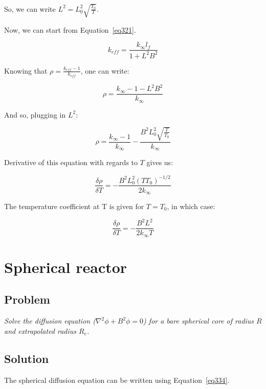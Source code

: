 So, we can write $L^2 = L_0^2\sqrt{\frac{T_0}{T}}$.

Now, we can start from Equation~\ref{eq321}.


\begin{equation}\label{eq321}
k_{eff} = \frac{k_{\infty} l_f}{1 + L^2B^2}
\end{equation}

Knowing that $\rho = \frac{k_{eff} - 1}{k_{eff}}$, one can write:


\begin{equation}\label{eq322}
\rho = \frac{k_{\infty} - 1 - L^2B^2}{k_{\infty}}
\end{equation}

And so, plugging in $L^2$:


\begin{equation}\label{eq323}
\rho = \frac{k_{\infty} - 1}{k_{\infty}} - \frac{B^2L_0^2\sqrt{\frac{T}{T_0}}}{k_{\infty}}
\end{equation}

Derivative of this equation with regards to $T$ gives us:


\begin{equation}\label{eq324}
\frac{\delta \rho}{\delta T} = - \frac{B^2L_0^2(T T_0)^{-1/2}}{2k_{\infty}}
\end{equation}

The temperature coefficient at T is given for $T=T_0$, in which case:


\begin{equation}\label{eq325}
\frac{\delta \rho}{\delta T} = - \frac{B^2L^2}{2k_{\infty}T}
\end{equation}

\section{Spherical reactor}
\label{prob36}

\subsection{Problem}
\textit{Solve the diffusion equation ($\nabla^2 \phi + B^2\phi = 0$) for a bare spherical core of radius $R$ and extrapolated radius $R_e$.}

\subsection{Solution}

The spherical diffusion equation can be written using Equation~\ref{eq334}.


